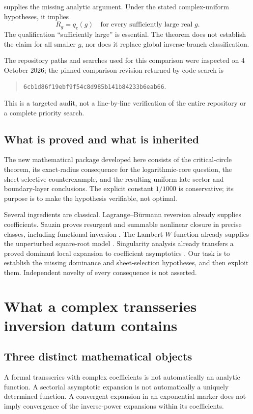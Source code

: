 \documentclass[11pt,a4paper]{article}
\numberwithin{equation}{section}
\theoremstyle{definition}
\theoremstyle{remark}
\begin{document}
 supplies the missing analytic argument. Under the stated complex-uniform hypotheses, it implies
\begin{equation}
 \boxed{R_g=q_{\mathrm c}(g)\quad\text{for every sufficiently large real }g.}
 \label{eq:resolution}
\end{equation}
The qualification ``sufficiently large'' is essential. The theorem does not establish the claim for all smaller $g$, nor does it replace global inverse-branch classification.

The repository paths and searches used for this comparison were inspected on 4 October 2026; the pinned comparison revision returned by code search is
\begin{quote}\small\texttt{6cb1d86f19ebf9f54c8d985b141b84233b6eab66}.
\end{quote}
This is a targeted audit, not a line-by-line verification of the entire repository or a complete priority search.

\subsection{What is proved and what is inherited}
The new mathematical package developed here consists of the critical-circle theorem, its exact-radius consequence for the logarithmic-core question, the sheet-selective counterexample, and the resulting uniform late-sector and boundary-layer conclusions. The explicit constant $1/1000$ is conservative; its purpose is to make the hypothesis verifiable, not optimal.

Several ingredients are classical. Lagrange--B\"urmann reversion already supplies coefficients. Sauzin proves resurgent and summable nonlinear closure in precise classes, including functional inversion \cite{sauzin}. The Lambert $W$ function already supplies the unperturbed square-root model \cite{dlmf}. Singularity analysis already transfers a proved dominant local expansion to coefficient asymptotics \cite{fs}. Our task is to establish the missing dominance and sheet-selection hypotheses, and then exploit them. Independent novelty of every consequence is not asserted.

\section{What a complex transseries inversion datum contains}
\label{sec:framework}
\subsection{Three distinct mathematical objects}
A formal transseries with complex coefficients is not automatically an analytic function. A sectorial asymptotic expansion is not automatically a uniquely determined function. A convergent expansion in an exponential marker does not imply convergence of the inverse-power expansions within its coefficients.
\end{document}
